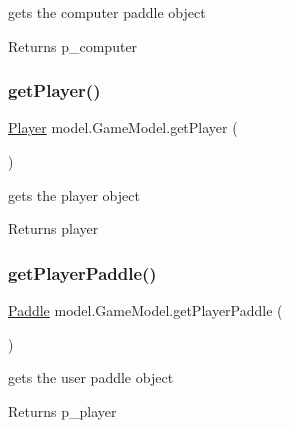 gets the computer paddle object 

\begin{DoxyReturn}{Returns}
p\+\_\+computer 
\end{DoxyReturn}
\hypertarget{classmodel_1_1_game_model_a67c62132a9e3578c642613d54350ca75}{}\label{classmodel_1_1_game_model_a67c62132a9e3578c642613d54350ca75} 
\subsubsection{\texorpdfstring{get\+Player()}{getPlayer()}}
{\footnotesize\ttfamily \hyperlink{classmodel_1_1_player}{Player} model.\+Game\+Model.\+get\+Player (\begin{DoxyParamCaption}{ }\end{DoxyParamCaption})}



gets the player object 

\begin{DoxyReturn}{Returns}
player 
\end{DoxyReturn}
\hypertarget{classmodel_1_1_game_model_a8bdb8971824c753c8074ccc0fadf56fc}{}\label{classmodel_1_1_game_model_a8bdb8971824c753c8074ccc0fadf56fc} 
\subsubsection{\texorpdfstring{get\+Player\+Paddle()}{getPlayerPaddle()}}
{\footnotesize\ttfamily \hyperlink{classmodel_1_1_paddle}{Paddle} model.\+Game\+Model.\+get\+Player\+Paddle (\begin{DoxyParamCaption}{ }\end{DoxyParamCaption})}



gets the user paddle object 

\begin{DoxyReturn}{Returns}
p\+\_\+player 
\end{DoxyReturn}
\hypertarget{classmodel_1_1_game_model_a76b4c67d259ce96f0bd20f6c27284ac0}{}\label{classmodel_1_1_game_model_a76b4c67d259ce96f0bd20f6c27284ac0} 
